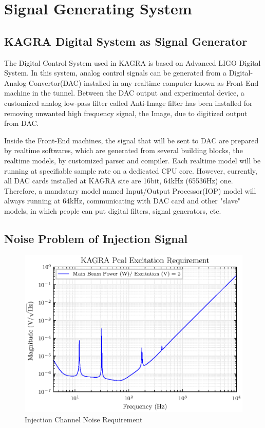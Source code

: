 \chapter{Signal Generating System}

\section{KAGRA Digital System as Signal Generator}
The Digital Control System used in KAGRA is based on Advanced LIGO Digital System. In this system, analog control signals can be generated from a Digital-Analog Convertor(DAC) installed in any realtime computer known as Front-End machine in the tunnel. Between the DAC output and experimental device, a customized analog low-pass filter called Anti-Image filter has been installed for removing unwanted high frequency signal, the Image, due to digitized output from DAC. 

Inside the Front-End machines, the signal that will be sent to DAC are prepared by realtime softwares, which are generated from several building blocks, the realtime models, by customized parser and compiler. Each realtime model will be running at specifiable sample rate on a dedicated CPU core. However, currently, all DAC cards installed at KAGRA site are 16bit, 64kHz (65536Hz) one. Therefore, a mandatary model named Input/Output Processor(IOP) model will always running at 64kHz, communicating with DAC card and other "slave" models, in which people can put digital filters, signal generators, etc.


\section{Noise Problem of Injection Signal}


\begin{figure}[hbt!]
\centering
\includegraphics[width=.9\textwidth]{figure/DAC_requirement.eps}
\caption{Injection Channel Noise Requirement}\label{fig:DAC_noise_requirement}
\end{figure}

